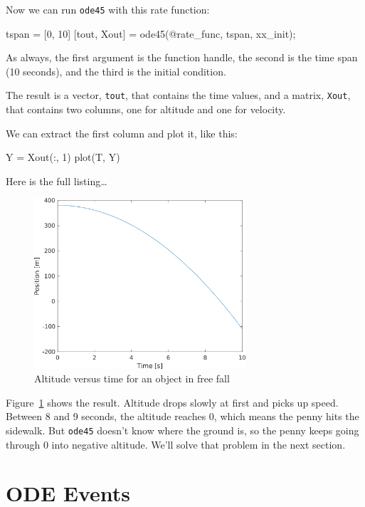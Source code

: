 Now we can run \lstinline{ode45} with this rate function:

\begin{code}
tspan = [0, 10]
[tout, Xout] = ode45(@rate_func, tspan, xx_init);
\end{code}

As always, the first argument is the function handle, the second is the time span (10 seconds), and the third is the initial condition.

The result is a vector, \lstinline{tout}, that contains the time values, and a matrix, \lstinline{Xout}, that contains two columns, one for altitude and one for velocity.

We can extract the first column and plot it, like this:

\begin{code}
Y = Xout(:, 1)
plot(T, Y)
\end{code}

Here is the full listing\dots


\begin{figure}
\centerline{\includegraphics[width=0.7\textwidth]{../code/chap11/penny1.png}}
\caption{Altitude versus time for an object in free fall}
\label{fig:penny}
\end{figure}

Figure~\ref{fig:penny} shows the result.  Altitude drops slowly at first and picks up speed.  Between 8 and 9 seconds, the altitude reaches 0, which means the penny hits the sidewalk.  But \lstinline{ode45} doesn't know where the ground is, so  the penny keeps going through 0 into negative altitude.  We'll solve that problem in the next section.

\section{ODE Events}
\label{events}

